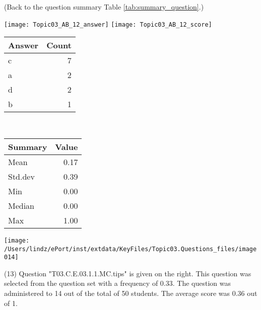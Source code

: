 \documentclass[12pt,english,nohyper]{tufte-handout}\usepackage[]{graphicx}\usepackage[]{color}
\begin{document}
 (Back to the question summary Table \ref{tab:summary_question}.)

\begin{center} \texttt{[image: Topic03\_AB\_12\_answer]} \texttt{[image: Topic03\_AB\_12\_score]} \end{center} 

\begin{center}%
\begin{tabular}{lr}
  \hline
Answer & Count \\ 
  \hline
c &   7 \\ 
  a &   2 \\ 
  d &   2 \\ 
  b &   1 \\ 
   \hline
\end{tabular}
~~~~~~~~%
\begin{tabular}{lr}
  \hline
Summary & Value \\ 
  \hline
Mean & 0.17 \\ 
  Std.dev & 0.39 \\ 
  Min & 0.00 \\ 
  Median & 0.00 \\ 
  Max & 1.00 \\ 
   \hline
\end{tabular}
\end{center}\newpage{}



\vspace{4cm}\begin{marginfigure}\texttt{[image: /Users/lindz/ePort/inst/extdata/KeyFiles/Topic03.Questions\_files/image014]}\end{marginfigure}\vspace{-4cm} (13) Question "T03.C.E.03.1.1.MC.tips" is given on the right. This question was selected from the question set with a frequency of 0.33. The question was administered to 14 out of the total of 50 students. The average score was 0.36 out of 1.
\end{document}
